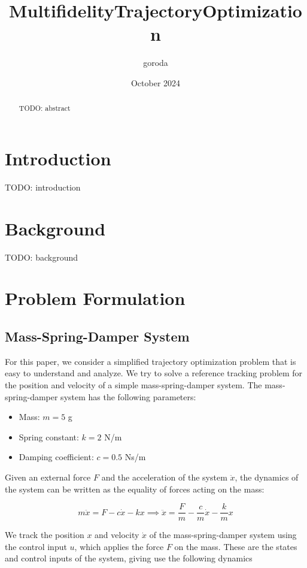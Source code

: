\documentclass{article}
\title{MultifidelityTrajectoryOptimization}
\author{goroda }
\date{October 2024}
\begin{document}
\maketitle

\begin{abstract}
  TODO: abstract
\end{abstract}

\section{Introduction}
TODO: introduction
\section{Background}
TODO: background

\section{Problem Formulation}
\subsection{Mass-Spring-Damper System}
For this paper, we consider a simplified trajectory optimization problem that is easy to understand and analyze.
We try to solve a reference tracking problem for the position and velocity of a simple mass-spring-damper system.
The mass-spring-damper system has the following parameters:
\begin{itemize}
  \item Mass: $m = 5$ g
  \item Spring constant: $k = 2$ N/m
  \item Damping coefficient: $c = 0.5$ Ns/m
\end{itemize}

Given an external force $F$ and the acceleration of the system $\ddot{x}$,
the dynamics of the system can be written as the equality of forces acting on the mass:

\begin{equation}
  m\ddot{x} = F - c\dot{x} - kx
  \implies \ddot{x} = \frac{F}{m} - \frac{c}{m}\dot{x} - \frac{k}{m}x
\end{equation}

We track the position $x$ and velocity $\dot{x}$ of the mass-spring-damper system using the control input $u$, which applies the force $F$ on the mass.
These are the states and control inputs of the system, giving use the following dynamics
\end{document}
